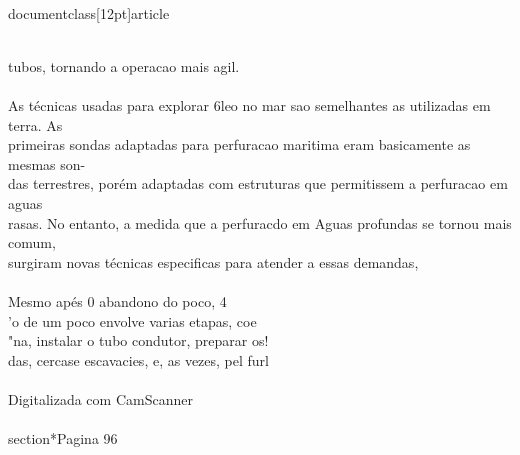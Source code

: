 \\documentclass[12pt]{article}
\begin{document}
\\
tubos, tornando a operacao mais agil.\\
\\
As técnicas usadas para explorar 6leo no mar sao semelhantes as utilizadas em terra. As\\
primeiras sondas adaptadas para perfuracao maritima eram basicamente as mesmas son-\\
das terrestres, porém adaptadas com estruturas que permitissem a perfuracao em aguas\\
rasas. No entanto, a medida que a perfuracdo em Aguas profundas se tornou mais comum,\\
surgiram novas técnicas especificas para atender a essas demandas,\\
\\
Mesmo apés 0 abandono do poco, 4\\
'o de um poco envolve varias etapas, coe\\
"na, instalar o tubo condutor, preparar os!\\
das, cercase escavacies, e, as vezes, pel furl\\
\\
Digitalizada com CamScanner\\

\\section*{Pagina 96}
\end{document}
